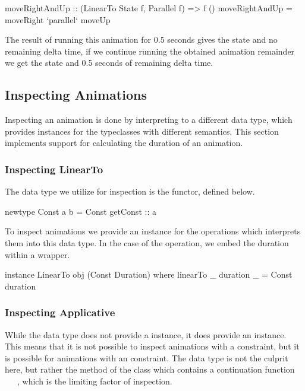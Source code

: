 \begin{code}
moveRightAndUp :: (LinearTo State f, Parallel f) => f ()
moveRightAndUp = moveRight `parallel` moveUp
\end{code}

The result of running this animation for 0.5 seconds gives the state  and no remaining delta time, if we continue running the obtained animation remainder we get the state  and 0.5 seconds of remaining delta time.

\subsection{Inspecting Animations}

Inspecting an animation is done by interpreting \dsl{} to a different data type, which provides instances for the typeclasses with different semantics. This section implements support for calculating the duration of an animation.

\subsubsection{Inspecting LinearTo}

The data type we utilize for inspection is the  functor, defined below.

\begin{spec}
newtype Const a b = Const { getConst :: a }
\end{spec}

To inspect animations we provide an instance for the operations which interprets them into this data type. In the case of the  operation, we embed the duration within a  wrapper.

\begin{code}
instance LinearTo obj (Const Duration) where
  linearTo _ duration _ = Const duration
\end{code}

\subsubsection{Inspecting Applicative}

While the  data type does not provide a  instance, it does provide an  instance. This means that it is not possible to inspect animations with a  constraint, but it is possible for animations with an  constraint. The  data type is not the culprit here, but rather the \hs{>>=} method of the  class which contains a continuation function ~\hs{->}~~, which is the limiting factor of inspection.

